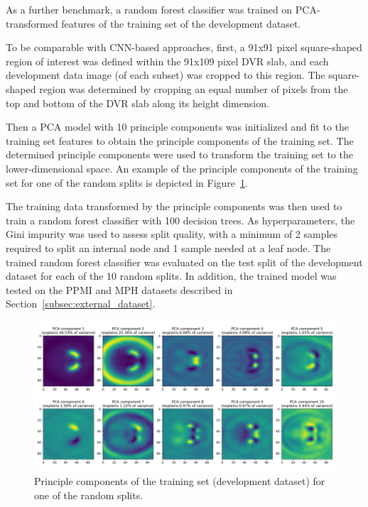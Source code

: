 As a further benchmark, a random forest classifier was trained on PCA-transformed features of the training set 
of the development dataset.

To be comparable with CNN-based approaches, first, a 91x91 pixel square-shaped region of interest 
was defined within the 91x109 pixel DVR slab, and each development data image (of each subset) was cropped to this region.
The square-shaped region was determined by cropping an equal number of pixels from the top and bottom 
of the DVR slab along its height dimension.

Then a PCA model with 10 principle components was initialized and fit to the training set features to obtain 
the principle components of the training set.
The determined principle components were used to transform the training set to the lower-dimensional space.
An example of the principle components of the training set for one of the random splits is depicted in Figure~\ref{fig:pca_components}.

The training data transformed by the principle components was then used to train a random forest classifier with 100 decision trees.
As hyperparameters, the Gini impurity was used to assess split quality, 
with a minimum of 2 samples required to split an internal node and 1 sample needed at a leaf node.
The trained random forest classifier was evaluated on the test split of the development dataset for each of the 10 random splits.
In addition, the trained model was tested on the PPMI and MPH datasets described in Section~\ref{subsec:external_dataset}.

\begin{figure}[ht]
  \centering
  \includegraphics[width=1.0\textwidth]{content/figures/pca_components_splittrain.png}
  \caption{Principle components of the training set (development dataset) for one of the random splits.} 
  \label{fig:pca_components}
\end{figure} 

